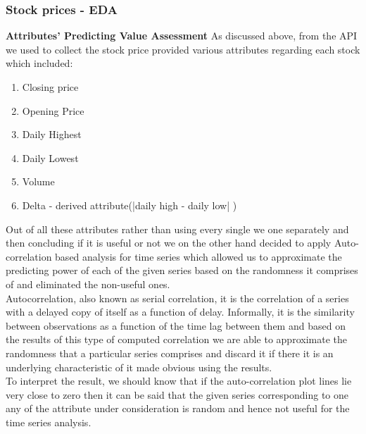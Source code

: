 \documentclass[sigconf, nonacm]{acmart}
\begin{document}
\subsubsection{Stock prices - EDA}
\textbf{Attributes' Predicting Value Assessment }
As discussed above, from the API we used to collect the stock price provided various attributes regarding each stock which included:
\begin{enumerate}
    \item Closing price
    \item Opening Price
    \item Daily Highest
    \item Daily Lowest
    \item Volume
    \item Delta - derived attribute(|daily high - daily low| )
\end{enumerate}
Out of all these attributes rather than using every single we one separately and then concluding if it is useful or not we on the other hand decided to apply Auto-correlation based analysis for time series which allowed us to approximate the predicting power of each of the given series based on the randomness it comprises of and eliminated the non-useful ones. 
\\Autocorrelation, also known as serial correlation, it is the correlation of a series with a delayed copy of itself as a function of delay. Informally, it is the similarity between observations as a function of the time lag between them and based on the results of this type of computed correlation we are able to approximate the randomness that a particular series comprises and discard it if there it is an underlying characteristic of it made obvious using the results.
\\ To interpret the result, we should know that if the auto-correlation plot lines lie very close to zero then it can be said that the given series corresponding to one any of the attribute under consideration is random and hence not useful for the time series analysis.
\end{document}
